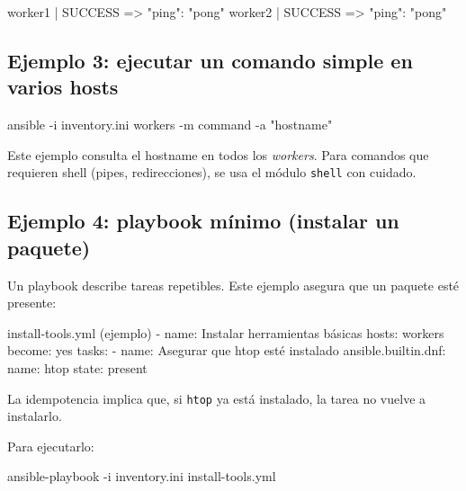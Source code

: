 \begin{outputblock}
worker1 | SUCCESS => {"ping": "pong"}
worker2 | SUCCESS => {"ping": "pong"}
\end{outputblock}


\subsection{Ejemplo 3: ejecutar un comando simple en varios hosts}
\label{subsec:ansible_ej3_command}

\begin{bashcode}
ansible -i inventory.ini workers -m command -a "hostname"
\end{bashcode}

Este ejemplo consulta el hostname en todos los \textit{workers}. Para comandos que requieren shell (pipes, redirecciones), se usa el módulo \texttt{shell} con cuidado.

\subsection{Ejemplo 4: playbook mínimo (instalar un paquete)}
\label{subsec:ansible_ej4_playbook}

Un playbook describe tareas repetibles. Este ejemplo asegura que un paquete esté presente:

\begin{yamlcode}
install-tools.yml (ejemplo)
- name: Instalar herramientas básicas
  hosts: workers
  become: yes
  tasks:
    - name: Asegurar que htop esté instalado
      ansible.builtin.dnf:
        name: htop
        state: present
\end{yamlcode}

La idempotencia implica que, si \texttt{htop} ya está instalado, la tarea no vuelve a instalarlo. \cite{ansible_playbooks_intro,ansible_modules_intro}

Para ejecutarlo:

\begin{bashcode}
ansible-playbook -i inventory.ini install-tools.yml
\end{bashcode}


